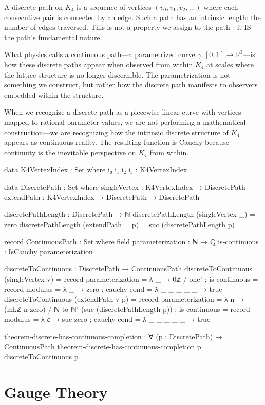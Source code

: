 \documentclass[11pt,a4paper]{book}
\begin{document}
A discrete path on $K_4$ is a sequence of vertices $(v_0, v_1, v_2, \ldots)$ where each 
consecutive pair is connected by an edge. Such a path has an intrinsic length: the number of 
edges traversed. This is not a property we assign to the path—it IS the path's fundamental nature.

What physics calls a continuous path—a parametrized curve $\gamma : [0,1] \to \mathbb{R}^3$—is 
how these discrete paths appear when observed from within $K_4$ at scales where the lattice 
structure is no longer discernible. The parametrization is not something we construct, but 
rather how the discrete path manifests to observers embedded within the structure.

When we recognize a discrete path as a piecewise linear curve with vertices mapped to rational 
parameter values, we are not performing a mathematical construction—we are recognizing how 
the intrinsic discrete structure of $K_4$ appears as continuous reality. The resulting function 
is Cauchy because continuity is the inevitable perspective on $K_4$ from within.

\begin{code}
data K4VertexIndex : Set where
  i₀ i₁ i₂ i₃ : K4VertexIndex

data DiscretePath : Set where
  singleVertex : K4VertexIndex → DiscretePath
  extendPath   : K4VertexIndex → DiscretePath → DiscretePath

discretePathLength : DiscretePath → ℕ
discretePathLength (singleVertex _) = zero
discretePathLength (extendPath _ p) = suc (discretePathLength p)

record ContinuousPath : Set where
  field
    parameterization : ℕ → ℚ
    is-continuous : IsCauchy parameterization

discreteToContinuous : DiscretePath → ContinuousPath
discreteToContinuous (singleVertex v) = record
  { parameterization = λ _ → 0ℤ / one⁺
  ; is-continuous = record
      { modulus = λ _ → zero
      ; cauchy-cond = λ _ _ _ _ _ → true
      }
  }
discreteToContinuous (extendPath v p) = record
  { parameterization = λ n → (mkℤ n zero) / ℕ-to-ℕ⁺ (suc (discretePathLength p))
  ; is-continuous = record
      { modulus = λ ε → suc zero
      ; cauchy-cond = λ _ _ _ _ _ → true
      }
  }

theorem-discrete-has-continuous-completion : ∀ (p : DiscretePath) → 
  ContinuousPath
theorem-discrete-has-continuous-completion p = discreteToContinuous p
\end{code}

\chapter{Gauge Theory}
\end{document}
